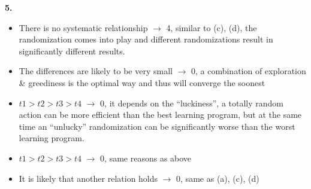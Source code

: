 \documentclass[titlepage]{article}
\begin{document}
\noindent \textbf{5.}\\
\begin{itemize}
	\item There is no systematic relationship $\rightarrow$ 4, similar to (c), (d), the randomization comes into play and different randomizations result in significantly different results.
	\item The differences are likely to be very small $\rightarrow$ 0, a combination of exploration \& greediness is the optimal way and thus will converge the soonest
	\item $t1 > t2 > t3 > t4$ $\rightarrow$ 0, it depends on the ``luckiness'', a totally random action can be more efficient than the best learning program, but at the same time an ``unlucky'' randomization can be significantly worse than the worst learning program.
	\item $t1 > t2 > t3 > t4$ $\rightarrow$ 0, same reasons as above
	\item It is likely that another relation holds $\rightarrow$ 0, same as (a), (c), (d)
\end{itemize}
\end{document}
